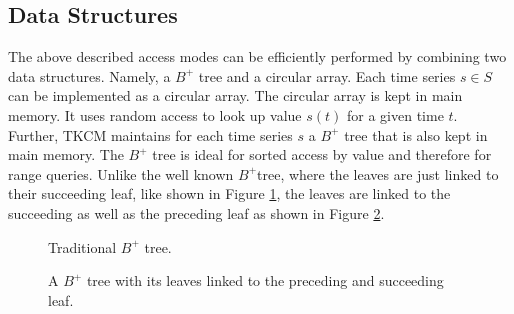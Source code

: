 \documentclass[abstracton,12pt]{scrreprt}
\begin{document}
\subsection{Data Structures}
The above described access modes can be efficiently performed by combining two data structures. Namely, a $B^+$ tree and a circular array. Each time series $s \in S$ can be implemented as a circular array. The circular array is kept in main memory. It uses random access to look up value $s(t)$ for a given time $t$. Further, TKCM maintains for each time series $s$ a $B^+$ tree that is also kept in main memory. The $B^+$ tree is ideal for sorted access by value and therefore for range queries. Unlike the well known $B^+$tree, where the leaves are just linked to their succeeding leaf, like shown in Figure \ref{fig:tratree}, the leaves are linked to the succeeding as well as the preceding leaf as shown in Figure \ref{fig:sptree}.
\begin{figure}[H]
		\centering

	\caption{Traditional $B^+$ tree.}
	\label{fig:tratree}
\end{figure}
\begin{figure}[H]
	\centering
	\caption{A $B^+$ tree with its leaves linked to the preceding and succeeding leaf.}
	\label{fig:sptree}
\end{figure}
\end{document}
